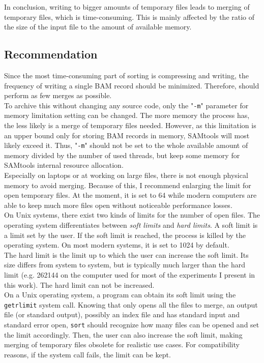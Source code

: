 In conclusion, writing to bigger amounts of temporary files leads to merging of temporary files, which is time-consuming. This is mainly affected by the ratio of the size of the input file to the amount of available memory.

\subsection{Recommendation}

Since the most time-consuming part of sorting is compressing and writing, the frequency of writing a single BAM record should be minimized. Therefore, \sort should perform as few merges as possible. \\
To archive this without changing any source code, only the "\texttt{-m}" parameter for memory limitation setting can be changed. The more memory the process has, the less likely is a merge of temporary files needed. However, as this limitation is an upper bound only for storing BAM records in memory, SAMtools will most likely exceed it. Thus, "\texttt{-m}" should not be set to the whole available amount of memory divided by the number of used threads, but keep some memory for SAMtools internal resource allocation. \\
Especially on laptops or at working on large files, there is not enough physical memory to avoid merging. Because of this, I recommend enlarging the limit for open temporary files. At the moment, it is set to 64 while modern computers are able to keep much more files open without noticeable performance losses. \\
On Unix systems, there exist two kinds of limits for the number of open files. The operating system differentiates between \textit{soft limits} and \textit{hard limits}.
A soft limit is a limit set by the user. If the soft limit is reached, the process is killed by the operating system. On most modern systems, it is set to 1024 by default. \\
The hard limit is the limit up to which the user can increase the soft limit. Its size differs from system to system, but is typically much larger than the hard limit (e.g. 262144 on the computer used for most of the experiments I present in this work). The hard limit can not be increased. \\
On a Unix operating system, a program can obtain its soft limit using the \texttt{getrlimit} \cite{noauthor_getrlimit2_nodate} system call. Knowing that \sort only opens all the files to merge, an output file (or standard output), possibly an index file and has standard input and standard error open, \texttt{sort} should recognize how many files can be opened and set the limit accordingly. Then, the user can also increase the soft limit, making merging of temporary files obsolete for realistic use cases. For compatibility reasons, if the system call fails, the limit can be kept.
